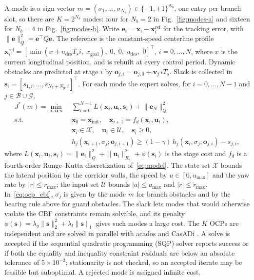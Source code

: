 \documentclass{article}
\theoremstyle{definition}
\begin{document}
A mode is a sign vector $m=(\sigma_1,\ldots,\sigma_{N_b})\in\{-1,+1\}^{N_b}$, one entry per branch slot, so there are $K=2^{N_b}$ modes: four for $N_b=2$ in Fig.~\ref{fig:modes-a} and sixteen for $N_b=4$ in Fig.~\ref{fig:modes-b}. Write $\mathbf{e}_i=\mathbf{x}_i-\mathbf{x}_i^{\mathrm{ref}}$ for the tracking error, with $\lVert\mathbf{e}\rVert_Q^2=\mathbf{e}^{\top}Q\mathbf{e}$. The reference is the constant-speed centerline profile $\mathbf{x}_i^{\mathrm{ref}}=[\min(x+u_{\mathrm{des}}T_s i,\;x_{\mathrm{goal}}),\;0,\;0,\;u_{\mathrm{des}},\;0]^{\top}$, $i=0,\ldots,N$, where $x$ is the current longitudinal position, and is rebuilt at every control period. Dynamic obstacles are predicted at stage $i$ by $\mathbf{o}_{j,i}=\mathbf{o}_{j,0}+\mathbf{v}_j\,iT_s$. Slack is collected in $\mathbf{s}_i=[s_{1,i},\ldots,s_{N_b+N_g,i}]^{\top}$. For each mode the expert solves, for $i=0,\ldots,N-1$ and $j\in\mathcal{B}\cup\mathcal{G}$,
\begin{subequations}
\label{eq:ocp}
\begin{align}
J^*(m)=\min_{\mathbf{x},\mathbf{u},\mathbf{s}}\;&
\sum_{i=0}^{N-1}L(\mathbf{x}_i,\mathbf{u}_i,\mathbf{s}_i)
+\lVert\mathbf{e}_N\rVert_Q^2\\
\text{s.t.}\;\;
&\mathbf{x}_0=\mathbf{x}_{\mathrm{init}},\quad
\mathbf{x}_{i+1}=f_d(\mathbf{x}_i,\mathbf{u}_i),\\
&\mathbf{x}_i\in\mathcal{X},\quad \mathbf{u}_i\in\mathcal{U},\quad \mathbf{s}_i\ge 0,\\
&h_j(\mathbf{x}_{i+1},\sigma_j;\mathbf{o}_{j,i+1})
\ge(1-\gamma)\,h_j(\mathbf{x}_i,\sigma_j;\mathbf{o}_{j,i})
- s_{j,i},
\label{eq:ocp_cbf}
\end{align}
\end{subequations}
where
$L(\mathbf{x}_i,\mathbf{u}_i,\mathbf{s}_i)
=\lVert\mathbf{e}_i\rVert_Q^2
+\lVert\mathbf{u}_i\rVert_{R_u}^2
+\phi(\mathbf{s}_i)$
is the stage cost and $f_d$ is a fourth-order Runge--Kutta discretization of~\eqref{eq:model}. The state set $\mathcal{X}$ bounds the lateral position by the corridor walls, the speed by $u\in[0,u_{\max}]$ and the yaw rate by $|r|\le r_{\max}$; the input set $\mathcal{U}$ bounds $|a|\le a_{\max}$ and $|\dot r|\le\dot r_{\max}$. In~\eqref{eq:ocp_cbf}, $\sigma_j$ is given by the mode $m$ for branch obstacles and by the bearing rule above for guard obstacles. The slack lets modes that would otherwise violate the CBF constraints remain solvable, and its penalty $\phi(\mathbf{s})=\lambda_q\lVert\mathbf{s}\rVert_2^2+\lambda_l\lVert\mathbf{s}\rVert_1$ gives such modes a large cost. 
The $K$ OCPs are independent and are solved in parallel with acados \citep{verschueren2022acados} and CasADi \citep{casadi}. A solve is accepted if the sequential quadratic programming (SQP) solver reports success or if both the equality and inequality constraint residuals are below an absolute tolerance of $5\times10^{-2}$; stationarity is not checked, so an accepted iterate may be feasible but suboptimal. A rejected mode is assigned infinite cost.
\end{document}
